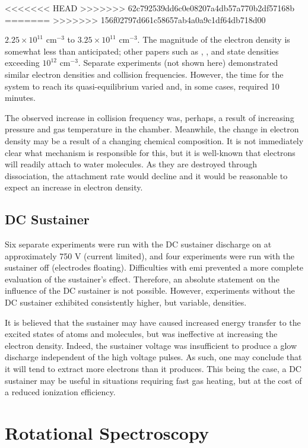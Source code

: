 <<<<<<< HEAD
>>>>>>> 62c792539dd6c0e08207a4db57a770b2df57168b
=======
>>>>>>> 156f02797d661c58657ab4a0a9c1df64db718d00

$2.25\times 10^{11}$ cm$^{-3}$ to $3.25\times 10^{11}$ cm$^{-3}$. The magnitude
of the electron density is somewhat less than anticipated; other papers such as
\cite{Aleksandrov2007}, \cite{Pancheshnyi1999}, and \cite{Macheret2006} state
densities exceeding $10^{12}$ cm$^{-3}$. Separate experiments (not shown here)
demonstrated similar electron densities and collision frequencies. However, the
time for the system to reach its quasi-equilibrium varied and, in some cases,
required 10 minutes.

The observed increase in collision frequency was, perhaps, a result of
increasing pressure and gas temperature in the chamber. Meanwhile, the change in
electron density may be a result of a changing chemical composition. It is not
immediately clear what mechanism is responsible for this, but it is well-known
that electrons will readily attach to water molecules. As they are destroyed
through dissociation, the attachment rate would decline and it would be
reasonable to expect an increase in electron density.

\subsection{DC Sustainer}

Six separate experiments were run with the DC sustainer discharge on at
approximately 750 V (current limited), and four experiments were run with the
sustainer off (electrodes floating). Difficulties with \acs{emi} prevented a
more complete evaluation of the sustainer's effect. Therefore, an absolute
statement on the influence of the DC sustainer is not possible. However,
experiments without the DC sustainer exhibited consistently higher, but
variable, densities.

It is believed that the sustainer may have caused increased energy transfer to
the excited states of atoms and molecules, but was ineffective at increasing the
electron density. Indeed, the sustainer voltage was insufficient to produce a
glow discharge independent of the high voltage pulses. As such, one may conclude
that it will tend to extract more electrons than it produces. This being the
case, a DC sustainer may be useful in situations requiring fast gas heating, but
at the cost of a reduced ionization efficiency.

\section{Rotational Spectroscopy}

